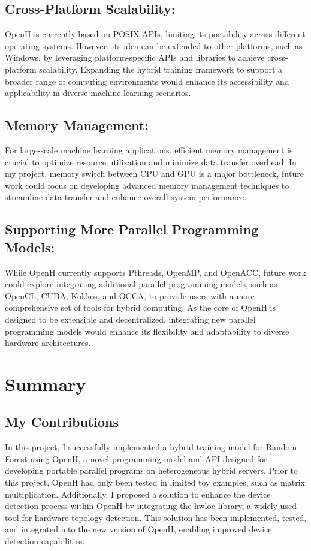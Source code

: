 \documentclass[13pt]{article}
\begin{document}
\subsection{Cross-Platform Scalability:}
OpenH is currently based on POSIX APIs, limiting its portability across different operating systems.
However, its idea can be extended to other platforms, such as Windows, by leveraging platform-specific APIs and libraries to achieve cross-platform scalability.
Expanding the hybrid training framework to support a broader range of computing environments would enhance its accessibility and applicability in diverse machine learning scenarios.

\subsection{Memory Management:}
For large-scale machine learning applications, efficient memory management is crucial to optimize resource utilization and minimize data transfer overhead.
In my project, memory switch between CPU and GPU is a major bottleneck, future work could focus on developing advanced memory management techniques to streamline data transfer and enhance overall system performance.

\subsection{Supporting More Parallel Programming Models:}
While OpenH currently supports Pthreads, OpenMP, and OpenACC, future work could explore integrating additional parallel programming models, such as OpenCL, CUDA, Kokkos, and OCCA, to provide users with a more comprehensive set of tools for hybrid computing.
As the core of OpenH is designed to be extensible and decentralized, integrating new parallel programming models would enhance its flexibility and adaptability to diverse hardware architectures.


\section{Summary}
\subsection{My Contributions}
In this project, I successfully implemented a hybrid training model for Random Forest using OpenH, a novel programming model and API designed for developing portable parallel programs on heterogeneous hybrid servers. Prior to this project, OpenH had only been tested in limited toy examples, such as matrix multiplication. Additionally, I proposed a solution to enhance the device detection process within OpenH by integrating the hwloc library, a widely-used tool for hardware topology detection. This solution has been implemented, tested, and integrated into the new version of OpenH, enabling improved device detection capabilities.
\end{document}
